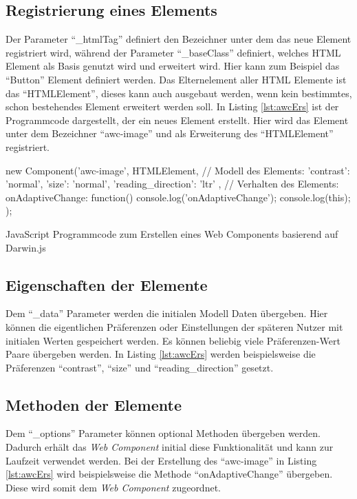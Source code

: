\documentclass[12pt, paper=a4, bibtotoc, toc=listof, headsepline=true]{scrreprt}
\begin{document}
	\subsection{Registrierung eines Elements}
	 Der Parameter \enquote{\_htmlTag} definiert den Bezeichner unter dem das neue Element registriert wird, während der Parameter \enquote{\_baseClass} definiert, welches \ac{HTML} Element als Basis genutzt wird und erweitert wird. Hier kann zum Beispiel das \enquote{Button} Element definiert werden. Das Elternelement aller \ac{HTML} Elemente ist das \enquote{HTMLElement}, dieses kann auch ausgebaut werden, wenn kein bestimmtes, schon bestehendes Element erweitert werden soll. In Listing \ref{lst:awcErs} ist der Programmcode dargestellt, der ein neues Element erstellt. Hier wird das Element unter dem Bezeichner \enquote{awc-image} und als Erweiterung des \enquote{HTMLElement} registriert.
	 \begin{listing}
	 	\begin{JavaScriptcode*}{}
new Component('awc-image', HTMLElement,
   // Modell des Elements:
   {
      'contrast': 'normal',
      'size': 'normal',
      'reading_direction': 'ltr'
   },
   // Verhalten des Elements:
   {
      onAdaptiveChange: function() {
      console.log('onAdaptiveChange');
      console.log(this);
   }
});
	 	\end{JavaScriptcode*}
	 	\caption[Web Component basierend auf Darwin.js]{JavaScript Programmcode zum Erstellen eines Web Components basierend auf Darwin.js}
	 	\label{lst:awcErs}  
	\end{listing}
	\subsection{Eigenschaften der Elemente}
	Dem \enquote{\_data} Parameter werden die initialen Modell Daten übergeben. Hier können die eigentlichen Präferenzen oder Einstellungen der späteren Nutzer mit initialen Werten gespeichert werden. Es können beliebig viele Präferenzen-Wert Paare übergeben werden. In Listing \ref{lst:awcErs} werden beispielsweise die Präferenzen \enquote{contrast}, \enquote{size} und \enquote{reading\_direction} gesetzt.
	\subsection{Methoden der Elemente}
	Dem \enquote{\_options} Parameter können optional Methoden übergeben werden. Dadurch erhält das \emph{Web Component} initial diese Funktionalität und kann zur Laufzeit verwendet werden. Bei der Erstellung des \enquote{awc-image} in Listing \ref{lst:awcErs} wird beispielsweise die Methode \enquote{onAdaptiveChange} übergeben. Diese wird somit dem \emph{Web Component} zugeordnet.
\end{document}
